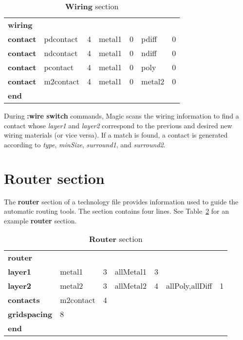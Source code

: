 \documentclass[letterpaper,twoside,12pt]{article}
\begin{document}
\begin{table}[ht]
   \begin{center}
      \begin{tabular}{|lllllll|} \hline
	{\bfseries wiring} &&&&&& \\
	{\bfseries contact} & pdcontact & 4 & metal1 & 0 & pdiff  & 0 \\
	{\bfseries contact} & ndcontact & 4 & metal1 & 0 & ndiff  & 0 \\
	{\bfseries contact} & pcontact  & 4 & metal1 & 0 & poly   & 0 \\
	{\bfseries contact} & m2contact & 4 & metal1 & 0 & metal2 & 0 \\
	{\bfseries end} &&&&&& \\ \hline
      \end{tabular}
      \caption{{\bfseries Wiring} section}
      \label{wiring}
   \end{center}
\end{table}

During {\bfseries :wire switch} commands, Magic scans the wiring information
to find a contact whose {\itshape layer1} and {\itshape layer2} correspond to the
previous and desired new wiring materials (or vice versa).
If a match is found, a contact is generated according to {\itshape type},
{\itshape minSize}, {\itshape surround1}, and {\itshape surround2}.

\section{Router section}

The {\bfseries router} section of a technology file provides information
used to guide the automatic routing tools.  The section contains four
lines.  See Table~\ref{router} for an example {\bfseries router} section.

\begin{table}[ht]
   \begin{center}
      \begin{tabular}{|lllllll|} \hline
	{\bfseries router} &&&&&& \\
	{\bfseries layer1} & metal1 & 3 & allMetal1 & 3 && \\
	{\bfseries layer2} & metal2 & 3 & allMetal2 & 4 & allPoly,allDiff & 1 \\
	{\bfseries contacts} & m2contact & 4 &&&& \\
	{\bfseries gridspacing} & 8 &&&& \\
	{\bfseries end} &&&&&& \\ \hline
      \end{tabular}
      \caption{{\bfseries Router} section}
      \label{router}
   \end{center}
\end{table}
\end{document}
